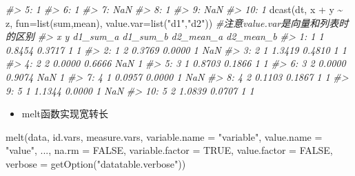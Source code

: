 \documentclass[
]{book}
\newenvironment{Shaded}{\begin{snugshade}}{\end{snugshade}}
\newcommand{\AttributeTok}[1]{\textcolor[rgb]{0.77,0.63,0.00}{#1}}
\newcommand{\CommentTok}[1]{\textcolor[rgb]{0.56,0.35,0.01}{\textit{#1}}}
\newcommand{\ConstantTok}[1]{\textcolor[rgb]{0.00,0.00,0.00}{#1}}
\newcommand{\FunctionTok}[1]{\textcolor[rgb]{0.00,0.00,0.00}{#1}}
\newcommand{\NormalTok}[1]{#1}
\newcommand{\SpecialCharTok}[1]{\textcolor[rgb]{0.00,0.00,0.00}{#1}}
\newcommand{\StringTok}[1]{\textcolor[rgb]{0.31,0.60,0.02}{#1}}
\providecommand{\tightlist}{%
  \setlength{\itemsep}{0pt}\setlength{\parskip}{0pt}}
\begin{document}
\begin{Shaded}
\begin{Highlighting}[]
\CommentTok{\#\textgreater{}  5:         1}
\CommentTok{\#\textgreater{}  6:         1}
\CommentTok{\#\textgreater{}  7:       NaN}
\CommentTok{\#\textgreater{}  8:         1}
\CommentTok{\#\textgreater{}  9:       NaN}
\CommentTok{\#\textgreater{} 10:         1}
\FunctionTok{dcast}\NormalTok{(dt, x }\SpecialCharTok{+}\NormalTok{ y }\SpecialCharTok{\textasciitilde{}}\NormalTok{ z, }\AttributeTok{fun=}\FunctionTok{list}\NormalTok{(sum,mean), }\AttributeTok{value.var=}\FunctionTok{list}\NormalTok{(}\StringTok{"d1"}\NormalTok{,}\StringTok{"d2"}\NormalTok{)) }\CommentTok{\#注意value.var是向量和列表时的区别}
\CommentTok{\#\textgreater{}     x y d1\_sum\_a d1\_sum\_b d2\_mean\_a d2\_mean\_b}
\CommentTok{\#\textgreater{}  1: 1 1   0.8454   0.3717         1         1}
\CommentTok{\#\textgreater{}  2: 1 2   0.3769   0.0000         1       NaN}
\CommentTok{\#\textgreater{}  3: 2 1   1.3419   0.4810         1         1}
\CommentTok{\#\textgreater{}  4: 2 2   0.0000   0.6666       NaN         1}
\CommentTok{\#\textgreater{}  5: 3 1   0.8703   0.1866         1         1}
\CommentTok{\#\textgreater{}  6: 3 2   0.0000   0.9074       NaN         1}
\CommentTok{\#\textgreater{}  7: 4 1   0.0957   0.0000         1       NaN}
\CommentTok{\#\textgreater{}  8: 4 2   0.1103   0.1867         1         1}
\CommentTok{\#\textgreater{}  9: 5 1   1.1344   0.0000         1       NaN}
\CommentTok{\#\textgreater{} 10: 5 2   1.0839   0.0707         1         1}
\end{Highlighting}
\end{Shaded}

\begin{itemize}
\tightlist
\item
  melt函数实现宽转长
\end{itemize}

\begin{Shaded}
\begin{Highlighting}[]
\FunctionTok{melt}\NormalTok{(data, id.vars, measure.vars,}
    \AttributeTok{variable.name =} \StringTok{"variable"}\NormalTok{, }\AttributeTok{value.name =} \StringTok{"value"}\NormalTok{,}
\NormalTok{    ..., }\AttributeTok{na.rm =} \ConstantTok{FALSE}\NormalTok{, }\AttributeTok{variable.factor =} \ConstantTok{TRUE}\NormalTok{,}
    \AttributeTok{value.factor =} \ConstantTok{FALSE}\NormalTok{,}
    \AttributeTok{verbose =} \FunctionTok{getOption}\NormalTok{(}\StringTok{"datatable.verbose"}\NormalTok{))}
\end{Highlighting}
\end{Shaded}
\end{document}
